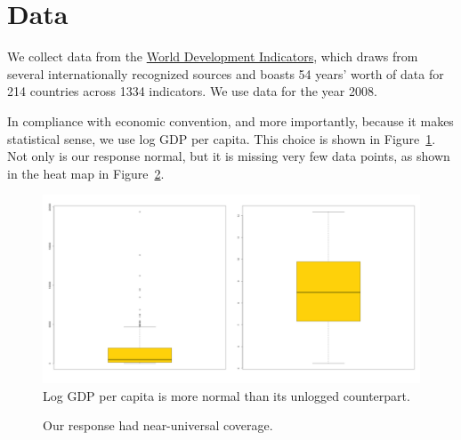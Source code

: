 \documentclass[12pt]{article}
\begin{document}
\section{Data}
We collect data from the \href{http://data.worldbank.org/indicator}{World Development Indicators}, 
which draws from several internationally recognized sources and boasts 54 years' worth of data for 214 countries across 1334 indicators.
We use data for the year 2008.\endnotemark[1]

In compliance with economic convention, and more importantly, because it makes statistical sense, we use log GDP per capita. This choice is shown in Figure~\ref{gdp_transform}. Not only is our response normal, but it is missing very few data points, as shown in the heat map in Figure~\ref{gdp_per_capita_heat_map}.

\begin{figure}[h!]
  \centering
  \includegraphics[width=\textwidth]{images/gdp_transform}
  \caption{\label{gdp_transform}Log GDP per capita is more normal than its unlogged counterpart.}
\end{figure}

\begin{figure}[h!]
  \centering
  \caption{\label{gdp_per_capita_heat_map}Our response had near-universal coverage.}
\end{figure}
\end{document}
